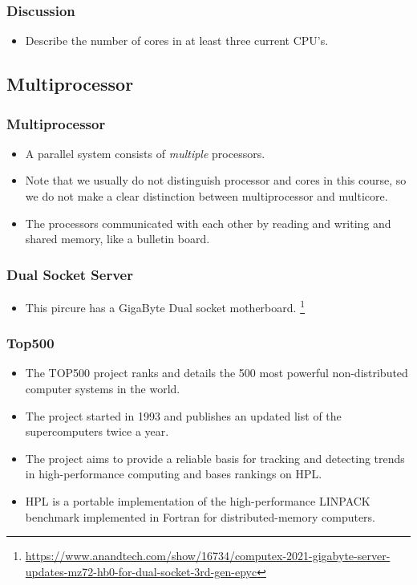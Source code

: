 \documentclass{beamer}
\begin{document}
\begin{CJK}{UTF8}{bsmi}
  \begin{frame}
    \frametitle{Discussion} 
    \begin{itemize}
    \item Describe the number of cores in at least three current CPU's.
    \end{itemize}
  \end{frame}


  \subsection{Multiprocessor}

  \begin{frame}
    \frametitle{Multiprocessor} 
    \begin{itemize}
    \item A parallel system consists of {\em multiple} processors.
    \item Note that we usually do not distinguish processor and cores
      in this course, so we do not make a clear distinction between
      multiprocessor and multicore.
    \item The processors communicated with each other by reading and writing and shared memory, like a bulletin board.
    \end{itemize}
  \end{frame}

  \begin{frame}
    \frametitle{Dual Socket Server}
    \begin{itemize}
    \item This pircure has a GigaByte Dual socket motherboard.
      \footnote{\url{https://www.anandtech.com/show/16734/computex-2021-gigabyte-server-updates-mz72-hb0-for-dual-socket-3rd-gen-epyc}}
    \end{itemize}
    \centerline{}
  \end{frame}




  \begin{frame}
    \frametitle{Top500}
    \begin{itemize}
    \item The TOP500 project ranks and details the 500 most powerful
      non-distributed computer systems in the world.
    \item The project started in 1993 and publishes an updated list of
      the supercomputers twice a year.
    \item The project aims to provide a reliable basis for tracking
      and detecting trends in high-performance computing and bases
      rankings on HPL.
    \item HPL is a portable implementation of the high-performance
      LINPACK benchmark implemented in Fortran for distributed-memory
      computers.
    \end{itemize}
  \end{frame}


\end{CJK}
\end{document}
